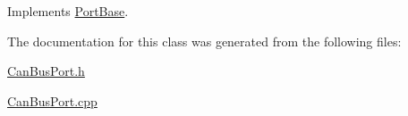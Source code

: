 Implements \hyperlink{classPortBase_a1d857a81a8e3f3bd460ef7c802ee762c}{Port\+Base}.



The documentation for this class was generated from the following files\+:\begin{DoxyCompactItemize}
\item 
\hyperlink{CanBusPort_8h}{Can\+Bus\+Port.\+h}\item 
\hyperlink{CanBusPort_8cpp}{Can\+Bus\+Port.\+cpp}\end{DoxyCompactItemize}
